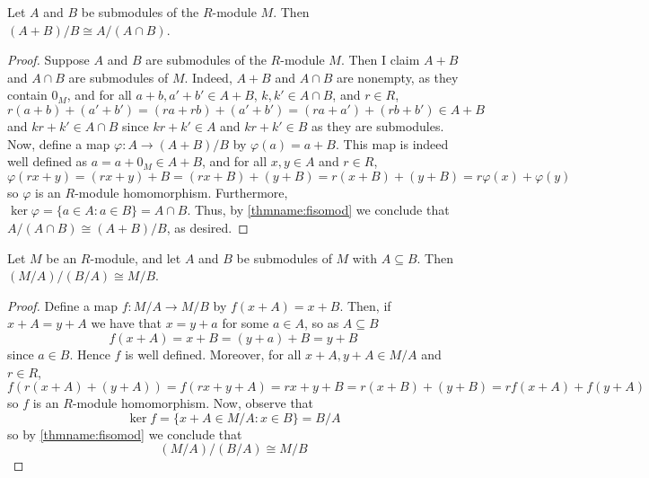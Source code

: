 \documentclass[12pt, a4paper, oneside, openright, titlepage]{book}
\begin{document}
\begin{namthm}\label{thmname:sisomod}
    Let $A$ and $B$ be submodules of the $R$-module $M$. Then $(A+B)/B\cong A/(A\cap B)$. 
\end{namthm}
\begin{proof}
    Suppose $A$ and $B$ are submodules of the $R$-module $M$. Then I claim $A+B$ and $A\cap B$ are submodules of $M$. Indeed, $A+B$ and $A\cap B$ are nonempty, as they contain $0_M$, and for all $a+b,a'+b' \in A+B$, $k,k' \in A\cap B$, and $r \in R$, \begin{equation*}
        r(a+b)+(a'+b') = (ra+rb)+(a'+b') = (ra+a')+(rb+b') \in A+B
    \end{equation*}
    and $kr+k' \in A\cap B$ since $kr+k' \in A$ and $kr+k' \in B$ as they are submodules. Now, define a map $\varphi:A\rightarrow (A+B)/B$ by $\varphi(a) = a+B$. This map is indeed well defined as $a = a+0_M \in A+B$, and for all $x,y \in A$ and $r \in R$, \begin{equation*}
        \varphi(rx+y) = (rx+y)+B = (rx+B)+(y+B) = r(x+B)+(y+B) = r\varphi(x)+\varphi(y)
    \end{equation*}
    so $\varphi$ is an $R$-module homomorphism. Furthermore, $\ker\varphi = \{a\in A: a \in B\} = A\cap B$. Thus, by \ref{thmname:fisomod} we conclude that $A/(A\cap B) \cong (A+B)/B$, as desired.
\end{proof}


\begin{namthm}\label{thmname:thisomod}
    Let $M$ be an $R$-module, and let $A$ and $B$ be submodules of $M$ with $A \subseteq B$. Then $(M/A)/(B/A) \cong M/B$. 
\end{namthm}
\begin{proof}
    Define a map $f:M/A\rightarrow M/B$ by $f(x+A) = x+B$. Then, if $x+A = y+A$ we have that $x=y+a$ for some $a \in A$, so as $A \subseteq B$ $$f(x+A) = x+B = (y+a) + B = y+B$$
    since $a \in B$. Hence $f$ is well defined. Moreover, for all $x+A,y+A \in M/A$ and $r \in R$, \begin{equation*}
        f(r(x+A)+(y+A)) = f(rx+y+A) = rx+y+B = r(x+B)+(y+B) = rf(x+A) + f(y+A)
    \end{equation*}
    so $f$ is an $R$-module homomorphism. Now, observe that $$\ker f = \{x+A \in M/A: x \in B\} = B/A$$
    so by \ref{thmname:fisomod} we conclude that \begin{equation*}
        (M/A)/(B/A) \cong M/B
    \end{equation*}
\end{proof}
\end{document}
